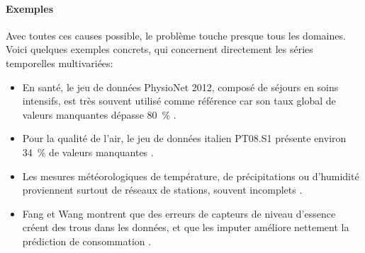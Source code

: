 \paragraph{Exemples}
Avec toutes ces causes possible, le problème touche presque tous les domaines. 
Voici quelques exemples concrets, qui concernent directement les séries temporelles multivariées:
\begin{itemize}
    \vspace{2mm}
    \item En santé, le jeu de données PhysioNet 2012, composé de séjours en soins intensifs, est très souvent utilisé comme référence car son taux global de valeurs manquantes dépasse 80~\% \cite{Luo_2018,Richter_2024,Wang_2025}.
    \vspace{2mm}
    \item Pour la qualité de l'air, le jeu de données italien PT08.S1 présente environ 34~\% de valeurs manquantes \cite{Richter_2024}.
    \vspace{2mm}
    \item Les mesures météorologiques de température, de précipitations ou d’humidité proviennent surtout de réseaux de stations, souvent incomplets \cite{Alejo-Sanchez_2025}.
    \vspace{2mm}
    \item Fang et Wang montrent que des erreurs de capteurs de niveau d'essence créent des trous dans les données, et que les imputer améliore nettement la prédiction de consommation \cite{Fang_2020}.
\end{itemize}


